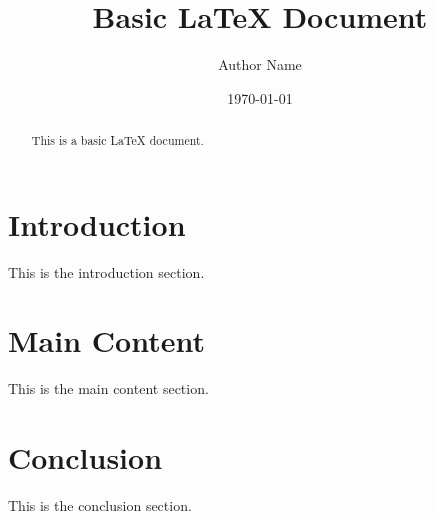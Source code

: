 \documentclass{article}
\title{Basic LaTeX Document}
\author{Author Name}
\date{\today}
\begin{document}
\maketitle

\begin{abstract}
This is a basic LaTeX document.
\end{abstract}

\section{Introduction}
This is the introduction section.

\section{Main Content}
This is the main content section.

\section{Conclusion}
This is the conclusion section.
\end{document}

